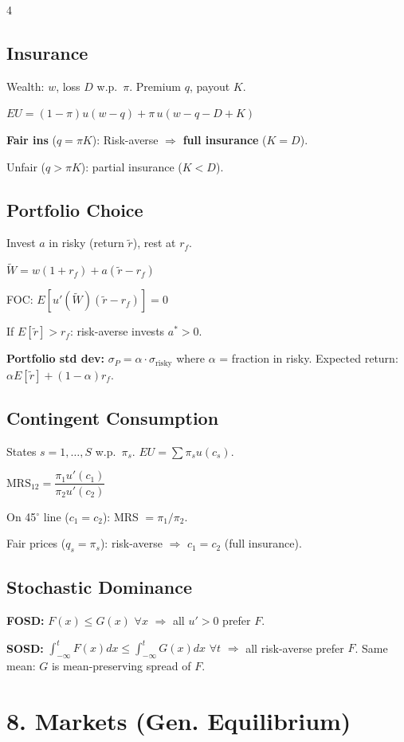 \documentclass[8pt,landscape]{extarticle}
\newcommand{\HI}[1]{\colorbox{yellow!30}{#1}}
\begin{document}
\begin{multicols}{4}
\subsection{Insurance}
Wealth: $w$, loss $D$ w.p.\ $\pi$. Premium $q$, payout $K$.

$EU = (1-\pi)u(w-q) + \pi\,u(w-q-D+K)$

\HI{\textbf{Fair ins} ($q=\pi K$):} Risk-averse $\Rightarrow$ \textbf{full insurance} ($K=D$).

Unfair ($q>\pi K$): partial insurance ($K<D$).

\subsection{Portfolio Choice}
Invest $a$ in risky (return $\tilde{r}$), rest at $r_f$.

$\tilde{W} = w(1+r_f) + a(\tilde{r}-r_f)$

FOC: $E[u'(\tilde{W})(\tilde{r}-r_f)]=0$

If $E[\tilde{r}]>r_f$: risk-averse invests $a^*>0$.

\textbf{Portfolio std dev:} $\sigma_P = \alpha\cdot\sigma_{\text{risky}}$ where $\alpha$ = fraction in risky. Expected return: $\alpha E[\tilde{r}] + (1-\alpha)r_f$.

\subsection{Contingent Consumption}
States $s=1,\ldots,S$ w.p.\ $\pi_s$. $EU = \sum \pi_s u(c_s)$.

$\text{MRS}_{12} = \dfrac{\pi_1 u'(c_1)}{\pi_2 u'(c_2)}$

On 45$^\circ$ line ($c_1=c_2$): MRS $= \pi_1/\pi_2$.

Fair prices ($q_s = \pi_s$): risk-averse $\Rightarrow$ $c_1=c_2$ (full insurance).

\subsection{Stochastic Dominance}
\textbf{FOSD:} $F(x)\leq G(x)$ $\forall x$ $\Rightarrow$ all $u'>0$ prefer $F$.

\textbf{SOSD:} $\int_{-\infty}^t F(x)dx \leq \int_{-\infty}^t G(x)dx$ $\forall t$ $\Rightarrow$ all risk-averse prefer $F$. Same mean: $G$ is mean-preserving spread of $F$.

\section{8. Markets (Gen. Equilibrium)}


\end{multicols}
\end{document}
